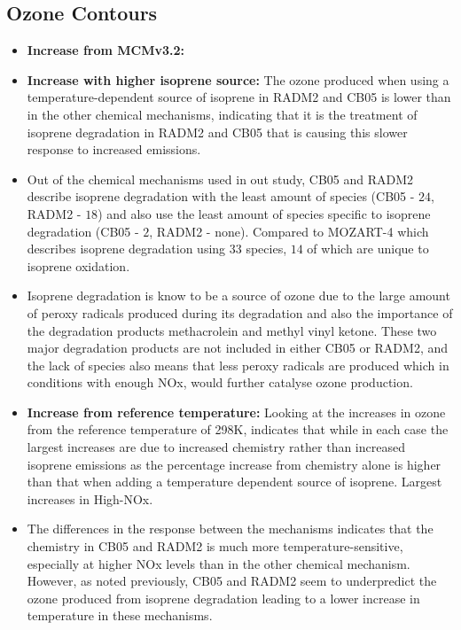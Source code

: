 \documentclass[11pt,a4paper]{article}
\begin{document}
\subsection{Ozone Contours}
\begin{itemize}
    \item \textbf{Increase from MCMv3.2:}
    \item \textbf{Increase with higher isoprene source:} The ozone produced when using a temperature-dependent source of isoprene in RADM2 and CB05 is lower than in the other chemical mechanisms, indicating that it is the treatment of isoprene degradation in RADM2 and CB05 that is causing this slower response to increased emissions.
    \item Out of the chemical mechanisms used in out study, CB05 and RADM2 describe isoprene degradation with the least amount of species (CB05 - $24$, RADM2 - $18$) and also use the least amount of species specific to isoprene degradation (CB05 - $2$, RADM2 - none). Compared to MOZART-4 which describes isoprene degradation using $33$ species, $14$ of which are unique to isoprene oxidation.
    \item Isoprene degradation is know to be a source of ozone due to the large amount of peroxy radicals produced during its degradation and also the importance of the degradation products methacrolein and methyl vinyl ketone. These two major degradation products are not included in either CB05 or RADM2, and the lack of species also means that less peroxy radicals are produced which in conditions with enough NOx, would further catalyse ozone production.
    \item \textbf{Increase from reference temperature:} Looking at the increases in ozone from the reference temperature of 298K, indicates that while in each case the largest increases are due to increased chemistry rather than increased isoprene emissions as the percentage increase from chemistry alone is higher than that when adding a temperature dependent source of isoprene. Largest increases in High-NOx.
    \item The differences in the response between the mechanisms indicates that the chemistry in CB05 and RADM2 is much more temperature-sensitive, especially at higher NOx levels than in the other chemical mechanism. However, as noted previously, CB05 and RADM2 seem to underpredict the ozone produced from isoprene degradation leading to a lower increase in temperature in these mechanisms.
\end{itemize}
\end{document}
